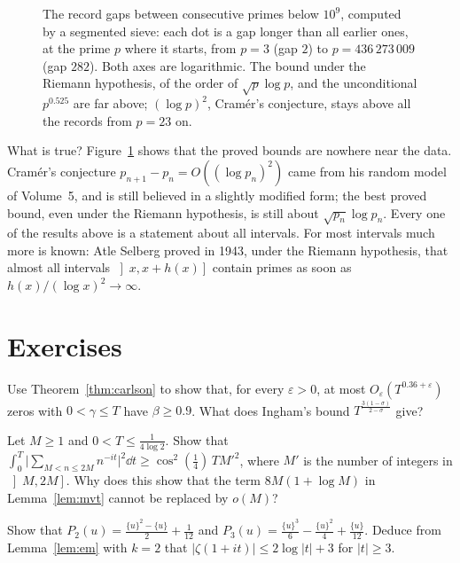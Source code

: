 \begin{figure}[ht]
\centering
{}
\caption{The record gaps between consecutive primes below $10^9$, computed by a segmented sieve: each dot is a gap longer than all earlier ones, at the prime $p$ where it starts, from $p=3$ (gap $2$) to $p=436\,273\,009$ (gap $282$). Both axes are logarithmic. The bound under the Riemann
hypothesis, of the order of $\sqrt p\log p$, and the unconditional $p^{0.525}$ are far above; $(\log p)^2$, Cram\'er's conjecture, stays above all the records from $p=23$ on.}
\label{fig:gaps}
\end{figure}

What is true? Figure~\ref{fig:gaps} shows that the proved bounds are nowhere near the data. Cram\'er's conjecture $p_{n+1}-p_n=O((\log p_n)^2)$ came from his random model of Volume~5, and is still believed in a slightly modified form; the best proved bound, even under the Riemann hypothesis, is still about $\sqrt{p_n}\log p_n$. Every
one of the results above is a statement about all intervals. For most intervals much more is known: Atle Selberg proved in 1943, under the Riemann hypothesis, that almost all intervals $\left]x,x+h(x)\right]$ contain primes as soon as $h(x)/(\log x)^2\to\infty$.

\section{Exercises}

\begin{exercise}[$\star$]\label{ex:carlsonnum}
Use Theorem~\ref{thm:carlson} to show that, for every $\varepsilon>0$, at most $O_\varepsilon(T^{0.36+\varepsilon})$ zeros with $0<\gamma\le T$ have $\beta\ge0.9$. What does Ingham's bound $T^{\frac{3(1-\sigma)}{2-\sigma}}$ give?
\end{exercise}

\begin{exercise}[$\star$]\label{ex:mvtsharp}
Let $M\ge1$ and $0<T\le\frac1{4\log2}$. Show that
$\int_0^T\bigl|\sum_{M<n\le2M}n^{-it}\bigr|^2\dd t\ge\cos^2(\frac14)\,TM'^2$, where $M'$ is the number of integers in $\left]M,2M\right]$. Why does this show that the term $8M(1+\log M)$ in Lemma~\ref{lem:mvt} cannot be replaced by $o(M)$?
\end{exercise}

\begin{exercise}[$\star$]\label{ex:pk}
Show that $P_2(u)=\frac{\{u\}^2-\{u\}}2+\frac1{12}$ and $P_3(u)=\frac{\{u\}^3}6-\frac{\{u\}^2}4+\frac{\{u\}}{12}$. Deduce from Lemma~\ref{lem:em} with $k=2$ that $|\zeta(1+it)|\le2\log|t|+3$ for $|t|\ge3$.
\end{exercise}

